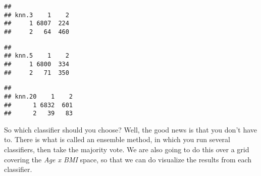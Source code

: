 \documentclass[]{article}
\newenvironment{Shaded}{\begin{snugshade}}{\end{snugshade}}
\newcommand{\KeywordTok}[1]{\textcolor[rgb]{0.13,0.29,0.53}{\textbf{#1}}}
\newcommand{\DecValTok}[1]{\textcolor[rgb]{0.00,0.00,0.81}{#1}}
\newcommand{\OperatorTok}[1]{\textcolor[rgb]{0.81,0.36,0.00}{\textbf{#1}}}
\newcommand{\NormalTok}[1]{#1}
\begin{document}
\begin{verbatim}
##      
## knn.3    1    2
##     1 6807  224
##     2   64  460
\end{verbatim}

\begin{Shaded}
\end{Shaded}

\begin{verbatim}
##      
## knn.5    1    2
##     1 6800  334
##     2   71  350
\end{verbatim}

\begin{Shaded}
\end{Shaded}

\begin{verbatim}
##       
## knn.20    1    2
##      1 6832  601
##      2   39   83
\end{verbatim}

So which classifier should you choose? Well, the good news is that you
don't have to. There is what is called an ensemble method, in which you
run several classifiers, then take the majority vote. We are also going
to do this over a grid covering the \emph{Age x BMI} space, so that we
can do visualize the results from each classifier.
\end{document}
